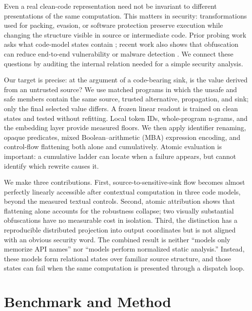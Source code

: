 \documentclass{article}
\begin{document}
Even a real clean-code representation need not be invariant to different presentations of the same computation. This matters in security: transformations used for packing, evasion, or software protection preserve execution while changing the structure visible in source or intermediate code. Prior probing work asks what code-model states contain \cite{troshin2022probing,chen2022cat}; recent work also shows that obfuscation can reduce end-to-end vulnerability or malware detection \cite{li2025obfuscation,boke2025camouflage}. We connect these questions by auditing the internal relation needed for a simple security analysis.

Our target is precise: at the argument of a code-bearing sink, is the value derived from an untrusted source? We use matched programs in which the unsafe and safe members contain the same source, trusted alternative, propagation, and sink; only the final selected value differs. A frozen linear readout is trained on clean states and tested without refitting. Local token IDs, whole-program n-grams, and the embedding layer provide measured floors. We then apply identifier renaming, opaque predicates, mixed Boolean--arithmetic (MBA) expression encoding, and control-flow flattening both alone and cumulatively. Atomic evaluation is important: a cumulative ladder can locate when a failure appears, but cannot identify which rewrite causes it.

We make three contributions. First, source-to-sensitive-sink flow becomes almost perfectly linearly accessible after contextual computation in three code models, beyond the measured textual controls. Second, atomic attribution shows that flattening alone accounts for the robustness collapse; two visually substantial obfuscations have no measurable cost in isolation. Third, the distinction has a reproducible distributed projection into output coordinates but is not aligned with an obvious security word. The combined result is neither ``models only memorize API names'' nor ``models perform normalized static analysis.'' Instead, these models form relational states over familiar source structure, and those states can fail when the same computation is presented through a dispatch loop.

\section{Benchmark and Method}
\end{document}
